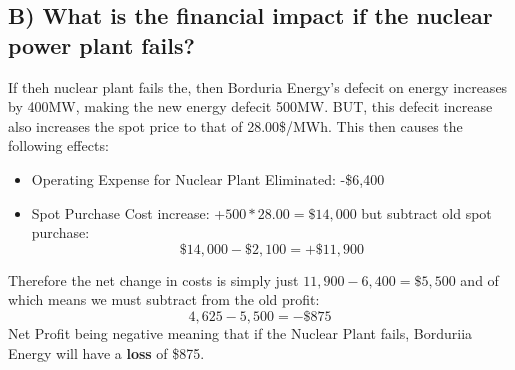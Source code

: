 \documentclass{article}
\begin{document}
\subsection{B) What is the financial impact if the nuclear power plant fails?}
If theh nuclear plant fails the, then Borduria Energy's defecit on energy increases by 400MW, making the new energy defecit 500MW. BUT, this defecit increase also increases the spot price to that of 28.00\$/MWh. This then causes the following effects:
\begin{itemize}
	\item Operating Expense for Nuclear Plant Eliminated: -\$6,400
	\item Spot Purchase Cost increase: +$500*28.00 = \$14,000$ but subtract old spot purchase:
		$$ \$14,000 - \$2,100 = +\$11,900 $$
\end{itemize}
Therefore the net change in costs is simply just $11,900 - 6,400 = \$5,500$ and of which means we must subtract from the old profit:
$$ 4,625 - 5,500 = -\$875 $$
Net Profit being negative meaning that if the Nuclear Plant fails, Borduriia Energy will have a \textbf{loss} of \$875.
\end{document}
